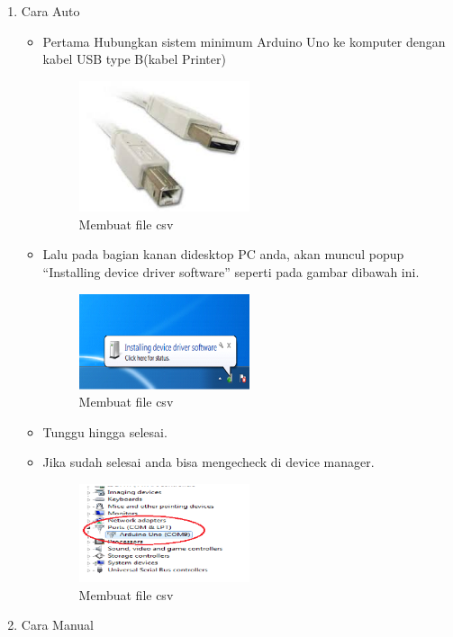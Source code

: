 \begin{enumerate}
\item Cara Auto
\begin{itemize}
\item Pertama Hubungkan sistem minimum Arduino Uno ke komputer dengan kabel USB type B(kabel Printer)
\begin{figure}[H] 
\includegraphics[width=5cm]{figures/5/Teori/1174038/1.jpg}
\centering
\caption{Membuat file csv}
\end{figure}

\item Lalu pada bagian kanan didesktop PC anda, akan muncul popup “Installing device driver software” seperti pada gambar dibawah ini.
\begin{figure}[H] 
\includegraphics[width=5cm]{figures/5/Teori/1174038/2.png}
\centering
\caption{Membuat file csv}
\end{figure}

\item Tunggu hingga selesai.
\item Jika sudah selesai anda bisa mengecheck di device manager.
\begin{figure}[H] 
\includegraphics[width=5cm]{figures/5/Teori/1174038/11.png}
\centering
\caption{Membuat file csv}
\end{figure}
\end{itemize}

\item Cara Manual


\end{enumerate}
